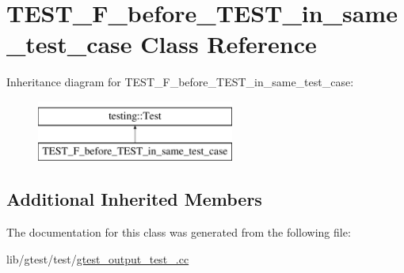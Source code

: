 \hypertarget{class_t_e_s_t___f__before___t_e_s_t__in__same__test__case}{\section{T\-E\-S\-T\-\_\-\-F\-\_\-before\-\_\-\-T\-E\-S\-T\-\_\-in\-\_\-same\-\_\-test\-\_\-case Class Reference}
\label{class_t_e_s_t___f__before___t_e_s_t__in__same__test__case}
}
Inheritance diagram for T\-E\-S\-T\-\_\-\-F\-\_\-before\-\_\-\-T\-E\-S\-T\-\_\-in\-\_\-same\-\_\-test\-\_\-case\-:\begin{figure}[H]
\begin{center}
\leavevmode
\includegraphics[height=2.000000cm]{class_t_e_s_t___f__before___t_e_s_t__in__same__test__case}
\end{center}
\end{figure}
\subsection*{Additional Inherited Members}


The documentation for this class was generated from the following file\-:\begin{DoxyCompactItemize}
\item 
lib/gtest/test/\hyperlink{gtest__output__test___8cc}{gtest\-\_\-output\-\_\-test\-\_\-.\-cc}\end{DoxyCompactItemize}
